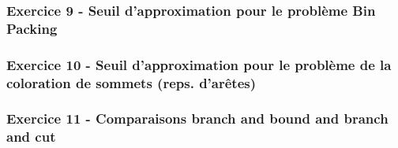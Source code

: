 \documentclass{article}
\begin{document}
\subsubsection*{Exercice 9 - Seuil d'approximation pour le problème Bin Packing}

\subsubsection*{Exercice 10 - Seuil d'approximation pour le problème de la coloration de sommets (reps. d'arêtes)}

\newpage
\subsubsection*{Exercice 11 - Comparaisons branch and bound and branch and cut}
\end{document}
